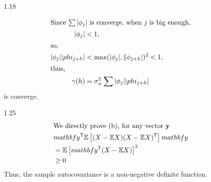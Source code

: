 \documentclass{article}
\newcommand{\ix}[1]{\intertext{{}#1}}
\newcommand{\tp}{^\mathsf{T}}
\begin{document}
\begin{CJK*}{GBK}{song}
\begin{enumerate}
\item[1.18]

\begin{align*}
\ix{Since $\sum |\phi_j|$ is converge, when $j$ is big enough,}
    |\phi_j|&<1,\\
\ix{so,} |\phi_j||phi_{j+h}|&<\max(|\phi_j|,\|\phi_{j+h}|)^2<1,\\
\ix{thus,} \gamma(h)&=\sigma_w^2\sum |\phi_j||phi_{j+h}|
\end{align*}
is converge.

\item[1.25]
\begin{align*}
    \ix{We directly prove (b), for any vector $\mathbf{y}$}
        &mathbf{y}\tp\mathbb{E}\left[(X-\mathbb{E}X)(X-\mathbb{E}X)\tp\right]mathbf{y}\\
    &=\mathbb{E}\left[mathbf{y}\tp(X-\mathbb{E}X)\right]^2\\
&\ge 0
\end{align*}
Thus, the sample autocovariance is a non-negative definite function.


\end{enumerate}
\end{CJK*}
\end{document}
